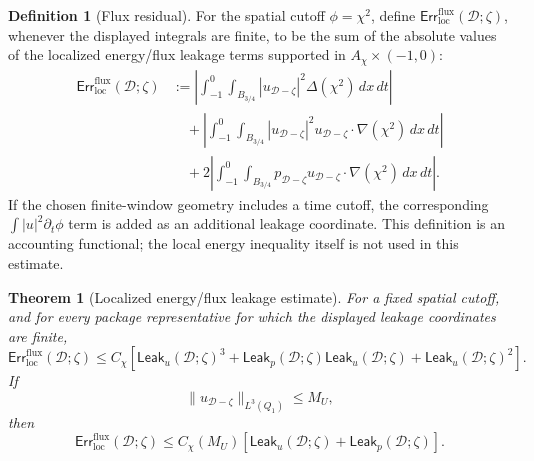 \documentclass[11pt]{article}
\numberwithin{equation}{section}
\newtheorem{theorem}{Theorem}[section]
\theoremstyle{definition}
\newtheorem{definition}[definition]{Definition}
\theoremstyle{remark}
\newcommand{\loc}{\mathrm{loc}}
\newcommand{\flux}{\mathrm{flux}}
\newcommand{\Err}{\mathsf{Err}}
\newcommand{\Leak}{\mathsf{Leak}}
\newcommand{\calD}{\mathcal D}
\newcommand{\Qone}{Q_1}
\begin{document}
\begin{definition}[Flux residual]
\label{loc:def:flux-localization-residual}
For the spatial cutoff \(\phi=\chi^2\), define
\(\Err_{\loc}^{\flux}(\calD;\zeta)\), whenever the displayed integrals are
finite, to be the sum of the absolute values of the localized energy/flux
leakage terms supported in \(A_\chi\times(-1,0)\):
\[
\begin{aligned}
    \Err_{\loc}^{\flux}(\calD;\zeta)
    &:=
    \left|
        \int_{-1}^{0}\int_{B_{3/4}}
        |u_{\calD-\zeta}|^2\Delta(\chi^2)\,dx\,dt
    \right| \\
    &\quad+
    \left|
        \int_{-1}^{0}\int_{B_{3/4}}
        |u_{\calD-\zeta}|^2
        u_{\calD-\zeta}\cdot\nabla(\chi^2)\,dx\,dt
    \right| \\
    &\quad+
    2\left|
        \int_{-1}^{0}\int_{B_{3/4}}
        p_{\calD-\zeta}
        u_{\calD-\zeta}\cdot\nabla(\chi^2)\,dx\,dt
    \right|.
\end{aligned}
\]
If the chosen finite-window geometry includes a time cutoff, the corresponding
\(\int |u|^2\partial_t\phi\) term is added as an additional leakage
coordinate.  This definition is an accounting functional; the local energy
inequality itself is not used in this estimate.
\end{definition}

\begin{theorem}[Localized energy/flux leakage estimate]
\label{loc:thm:flux-leakage-estimate}
For a fixed spatial cutoff, and for every package representative for which the
displayed leakage coordinates are finite,
\[
    \Err_{\loc}^{\flux}(\calD;\zeta)
    \le
    C_\chi
    \left[
        \Leak_u(\calD;\zeta)^3
        +
        \Leak_p(\calD;\zeta)\Leak_u(\calD;\zeta)
        +
        \Leak_u(\calD;\zeta)^2
    \right].
\]
If
\[
    \|u_{\calD-\zeta}\|_{L^3(\Qone)}\le M_U,
\]
then
\[
    \Err_{\loc}^{\flux}(\calD;\zeta)
    \le
    C_\chi(M_U)
    \left[
        \Leak_u(\calD;\zeta)
        +
        \Leak_p(\calD;\zeta)
    \right].
\]
\end{theorem}
\end{document}
